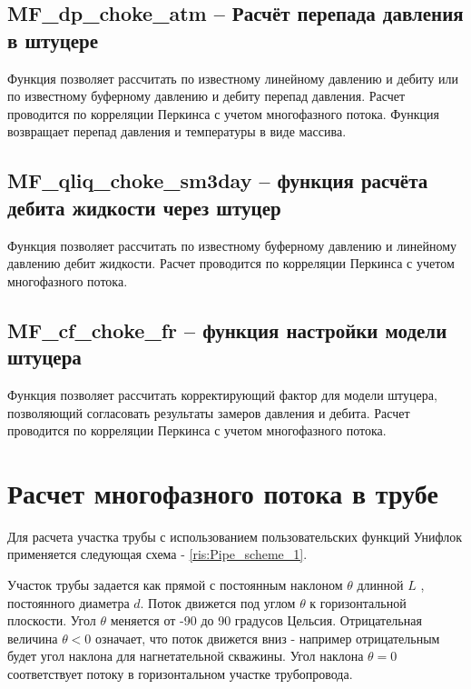 \subsection{MF\_dp\_choke\_atm – Расчёт перепада давления в штуцере}
Функция позволяет рассчитать по известному линейному давлению и дебиту или по известному буферному давлению и дебиту перепад давления.  Расчет проводится по корреляции Перкинса \cite{Perkins_1993} с учетом многофазного потока.  
Функция возвращает перепад давления и температуры в виде массива.


\subsection{MF\_qliq\_choke\_sm3day – функция расчёта дебита жидкости через штуцер}
Функция позволяет рассчитать по известному буферному давлению и линейному давлению дебит жидкости. Расчет проводится по корреляции Перкинса \cite{Perkins_1993} с учетом многофазного потока.  



\subsection{MF\_cf\_choke\_fr – функция настройки модели штуцера}
Функция позволяет рассчитать корректирующий фактор для модели штуцера, позволяющий согласовать результаты замеров давления и дебита. Расчет проводится по корреляции Перкинса \cite{Perkins_1993} с учетом многофазного потока.  


\newpage
\section{Расчет многофазного потока в трубе}

Для расчета участка трубы с использованием пользовательских функций Унифлок применяется следующая схема - \ref{ris:Pipe_scheme_1}.

Участок трубы задается как прямой с постоянным наклоном $\theta$  длинной $L$ , постоянного диаметра $d$. Поток движется под углом $\theta$ к горизонтальной плоскости. Угол  $\theta$ меняется от -90 до 90 градусов Цельсия. Отрицательная величина  $\theta < 0 $ означает, что поток движется вниз - например отрицательным будет угол наклона для нагнетательной скважины. Угол наклона $\theta = 0 $ соответствует потоку в горизонтальном участке трубопровода.

